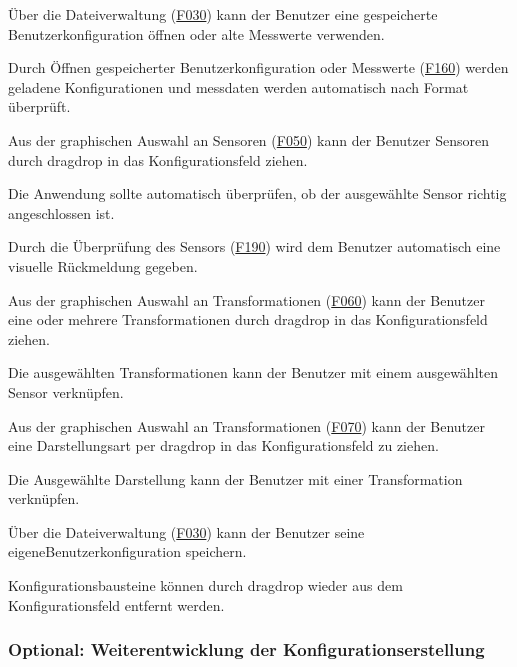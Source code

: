 \documentclass[parskip=full]{scrartcl}
\begin{document}
\begin{description}

\hypertarget{link-f160}{\item[F160]} Über die Dateiverwaltung (\hyperlink{link-f030}{F030}) kann der Benutzer eine gespeicherte \gls{Benutzerkonfiguration} öffnen oder alte Messwerte verwenden.
\hypertarget{link-f170}{\item[F170]} Durch Öffnen gespeicherter \gls{Benutzerkonfiguration} oder Messwerte (\hyperlink{link-f160}{F160}) werden geladene Konfigurationen und \gls{messdaten} werden automatisch nach Format überprüft.
\hypertarget{link-f180}{\item[F180]} Aus der graphischen Auswahl an Sensoren (\hyperlink{link-f050}{F050}) kann der Benutzer Sensoren durch \gls{dragdrop} in das Konfigurationsfeld ziehen.
\hypertarget{link-f190}{\item[F190]} Die Anwendung sollte automatisch überprüfen, ob der ausgewählte Sensor richtig angeschlossen ist.
\hypertarget{link-f200]}{\item[F200]} Durch die Überprüfung des Sensors (\hyperlink{link-f190}{F190}) wird dem Benutzer automatisch eine visuelle Rückmeldung gegeben.
\hypertarget{link-f210}{\item[F210]} Aus der graphischen Auswahl an Transformationen (\hyperlink{link-f060}{F060}) kann der Benutzer eine oder mehrere Transformationen durch \gls{dragdrop} in das Konfigurationsfeld ziehen.
\hypertarget{link-f220}{\item[F220]} Die ausgewählten Transformationen kann der Benutzer mit einem ausgewählten Sensor verknüpfen.
\hypertarget{link-f230}{\item[F230]} Aus der graphischen Auswahl an Transformationen (\hyperlink{link-f070}{F070}) kann der Benutzer eine Darstellungsart per \gls{dragdrop} in das Konfigurationsfeld zu ziehen.
\hypertarget{link-f240}{\item[F240]} Die Ausgewählte Darstellung kann der Benutzer mit einer Transformation verknüpfen.
\hypertarget{link-f250}{\item[F250]} Über die Dateiverwaltung (\hyperlink{link-f030}{F030}) kann der Benutzer seine eigene\gls{Benutzerkonfiguration} speichern.
\hypertarget{link-f260}{\item[F260]} Konfigurationsbausteine können durch \gls{dragdrop} wieder aus dem Konfigurationsfeld entfernt werden.

\end{description}

\subsubsection{Optional: Weiterentwicklung der Konfigurationserstellung}
\end{document}
